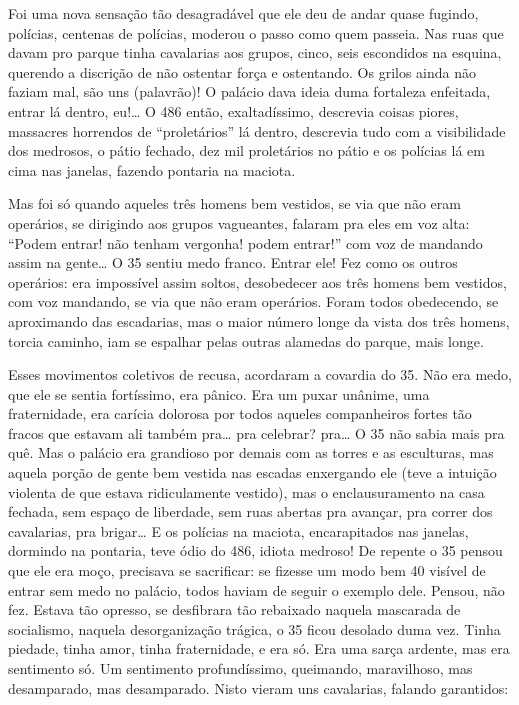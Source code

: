 \begin{linenumbers}
Foi uma nova sensação tão desagradável que ele deu de andar quase
fugindo, polícias, centenas de polícias, moderou o passo como quem
passeia. Nas ruas que davam pro parque tinha cavalarias aos grupos,
cinco, seis escondidos na esquina, querendo a discrição de não ostentar
força e ostentando. Os grilos ainda não faziam mal, são uns (palavrão)!
O palácio dava ideia duma fortaleza enfeitada, entrar lá dentro, eu!\ldots{}
O 486 então, exaltadíssimo, descrevia coisas piores, massacres horrendos
de ``proletários'' lá dentro, descrevia tudo com a visibilidade dos
medrosos, o pátio fechado, dez mil proletários no pátio e os polícias lá
em cima nas janelas, fazendo pontaria na maciota.

Mas foi só quando aqueles três homens bem vestidos, se via que não eram
operários, se dirigindo aos grupos vagueantes, falaram pra eles em voz
alta: ``Podem entrar! não tenham vergonha! podem entrar!'' com voz de
mandando assim na gente\ldots{} O 35 sentiu medo franco. Entrar ele! Fez como
os outros operários: era impossível assim soltos, desobedecer aos três
homens bem vestidos, com voz mandando, se via que não eram operários.
Foram todos obedecendo, se aproximando das escadarias, mas o maior
número longe da vista dos três homens, torcia caminho, iam se espalhar
pelas outras alamedas do parque, mais longe.

Esses movimentos coletivos de recusa, acordaram a covardia do 35. Não
era medo, que ele se sentia fortíssimo, era pânico. Era um puxar
unânime, uma fraternidade, era carícia dolorosa por todos aqueles
companheiros fortes tão fracos que estavam ali também pra\ldots{} pra
celebrar? pra\ldots{} O 35 não sabia mais pra quê. Mas o palácio era
grandioso por demais com as torres e as esculturas, mas aquela porção de
gente bem vestida nas escadas enxergando ele (teve a intuição violenta
de que estava ridiculamente vestido), mas o enclausuramento na casa
fechada, sem espaço de liberdade, sem ruas abertas pra avançar, pra
correr dos cavalarias, pra brigar\ldots{} E os polícias na maciota,
encarapitados nas janelas, dormindo na pontaria, teve ódio do 486,
idiota medroso! De repente o 35 pensou que ele era moço, precisava se
sacrificar: se fizesse um modo bem 40 visível de entrar sem medo no
palácio, todos haviam de seguir o exemplo dele. Pensou, não fez. Estava
tão opresso, se desfibrara tão rebaixado naquela mascarada de
socialismo, naquela desorganização trágica, o 35 ficou desolado duma
vez. Tinha piedade, tinha amor, tinha fraternidade, e era só. Era uma
sarça ardente, mas era sentimento só. Um sentimento profundíssimo,
queimando, maravilhoso, mas desamparado, mas desamparado. Nisto vieram
uns cavalarias, falando garantidos:


\end{linenumbers}
